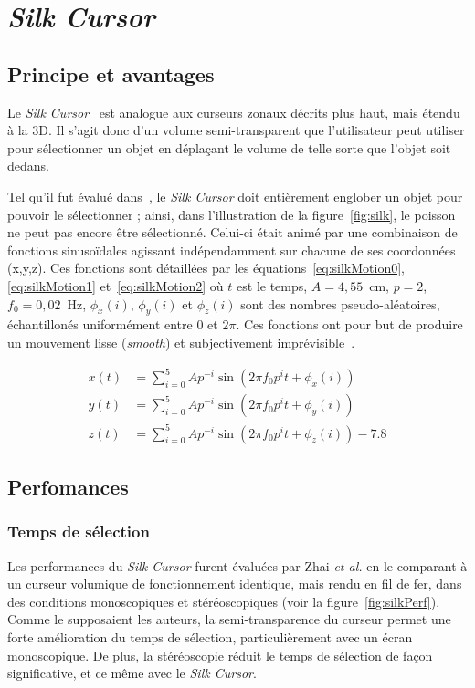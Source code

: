 \section{\emph{Silk Cursor}}
	\subsection{Principe et avantages}
	Le \emph{Silk Cursor}~\cite{zhai1994silk} est analogue aux curseurs zonaux décrits plus haut, mais étendu à la 3D. Il s'agit donc d'un volume semi-transparent que l'utilisateur peut utiliser pour sélectionner un objet en déplaçant le volume de telle sorte que l'objet soit dedans.
	
	Tel qu'il fut évalué dans~\cite{zhai1994silk}, le \emph{Silk Cursor} doit entièrement englober un objet pour pouvoir le sélectionner ; ainsi, dans l'illustration de la figure~\ref{fig:silk}, le poisson ne peut pas encore être sélectionné. Celui-ci était animé par une combinaison de fonctions sinusoïdales agissant indépendamment sur chacune de ses coordonnées (x,y,z). Ces fonctions sont détaillées par les équations~\ref{eq:silkMotion0}, \ref{eq:silkMotion1} et~\ref{eq:silkMotion2} où $t$ est le temps, $A = 4,55$~cm, $p = 2$, $f_{0} = 0,02$~Hz, 	$\phi_{x}(i)$, $\phi_{y}(i)$ et $\phi_{z}(i)$ sont des nombres pseudo-aléatoires, échantillonés uniformément entre $0$ et $2\pi$. Ces fonctions ont pour but de produire un mouvement lisse (\emph{smooth}) et subjectivement imprévisible~\cite{zhai1993human}.
	
	\begin{align}
		\label{eq:silkMotion0}
		x(t) &= \sum_{i=0}^{5} Ap^{-i} \sin \left( 2\pi{}f_{0}p^{i}t + \phi_{x}(i) \right) \\
		\label{eq:silkMotion1}
		y(t) &= \sum_{i=0}^{5} Ap^{-i} \sin \left( 2\pi{}f_{0}p^{i}t + \phi_{y}(i) \right) \\
		\label{eq:silkMotion2}
		z(t) &= \sum_{i=0}^{5} Ap^{-i} \sin \left( 2\pi{}f_{0}p^{i}t + \phi_{z}(i) \right) - 7.8
	\end{align}
	
	\subsection{Perfomances}
	\subsubsection{Temps de sélection}
	Les performances du \emph{Silk Cursor} furent évaluées par Zhai \emph{et al.} en le comparant à un curseur volumique de fonctionnement identique, mais rendu en fil de fer, dans des conditions monoscopiques et stéréoscopiques (voir la figure~\ref{fig:silkPerf}). Comme le supposaient les auteurs, la semi-transparence du curseur permet une forte amélioration du temps de sélection, particulièrement avec un écran monoscopique. De plus, la stéréoscopie réduit le temps de sélection de façon significative, et ce même avec le \emph{Silk Cursor}.
	
